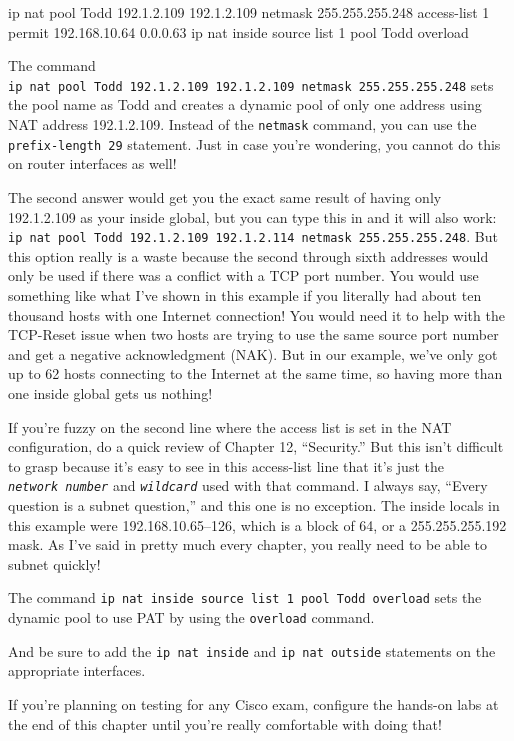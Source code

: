 \begin{cli}
ip nat pool Todd 192.1.2.109 192.1.2.109 netmask 255.255.255.248
access-list 1 permit 192.168.10.64 0.0.0.63
ip nat inside source list 1 pool Todd overload
\end{cli}

The command
\texttt{ip\ nat\ pool\ Todd\ 192.1.2.109\ 192.1.2.109\ netmask\ 255.255.255.248}
sets the pool name as Todd and creates a dynamic pool of only one
address using NAT address 192.1.2.109. Instead of the \texttt{netmask}
command, you can use the \texttt{prefix-length\ 29} statement. Just in
case you're wondering, you cannot do this on router interfaces as well!

The second answer would get you the exact same result of having only
192.1.2.109 as your inside global, but you can type this in and it will
also work:
\texttt{ip\ nat\ pool\ Todd\ 192.1.2.109\ 192.1.2.114\ netmask\ 255.255.255.248}.
But this option really is a waste because the second through sixth
addresses would only be used if there was a conflict with a TCP port
number. You would use something like what I've shown in this example if
you literally had about ten thousand hosts with one Internet connection!
You would need it to help with the TCP-Reset issue when two hosts are
trying to use the same source port number and get a negative
acknowledgment (NAK). But in our example, we've only got up to 62 hosts
connecting to the Internet at the same time, so having more than one
inside global gets us nothing!

If you're fuzzy on the second line where the access list is set in the
NAT configuration, do a quick review of Chapter 12, ``Security.'' But
this isn't difficult to grasp because it's easy to see in this
access-list line that it's just the \emph{\texttt{network\ number}} and
\emph{\texttt{wildcard}} used with that command. I always say, ``Every
question is a subnet question,'' and this one is no exception. The
inside locals in this example were 192.168.10.65--126, which is a block
of 64, or a 255.255.255.192 mask. As I've said in pretty much every
chapter, you really need to be able to subnet quickly!

The command
\texttt{ip\ nat\ inside\ source\ list\ 1\ pool\ Todd\ overload} sets the
dynamic pool to use PAT by using the \texttt{overload} command.

And be sure to add the \texttt{ip\ nat\ inside} and
\texttt{ip\ nat\ outside} statements on the appropriate interfaces.

\begin{note}
If you're planning on testing for any Cisco exam, configure the hands-on labs at the end of this chapter until you're really comfortable with doing that!
\end{note}

